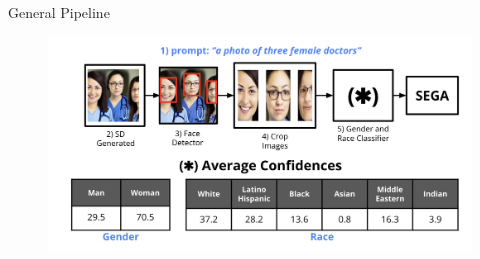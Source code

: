 \documentclass[final]{beamer}
\newlength{\twocolwid}
\begin{document}
\begin{frame}[t]
\begin{columns}[t]
\begin{column}{\twocolwid} %

\begin{columns}[t,totalwidth=\twocolwid] %

\begin{column}{\twocolwid}\vspace{-.6in} %




\begin{block}{General Pipeline}
    \begin{figure}
    \includegraphics[scale = 1.35]{GeneralPipeline1.png}
    \end{figure}


\end{block}
\end{column}
\end{columns}
\end{column}
\end{columns}
\end{frame}
\end{document}
